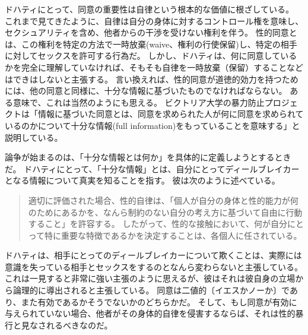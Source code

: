 \documentclass[paper=a4,book,openany]{jlreq}
\begin{document}
ドハティにとって、同意の重要性は自律という根本的な価値に根ざしている。
これまで見てきたように、自律は自分の身体に対するコントロール権を意味し、セクシュアリティを含め、他者からの干渉を受けない権利を伴う。
性的同意とは、この権利を特定の方法で一時放棄(waive、権利の行使保留)し、特定の相手に対してセックスを許可する行為だ。
しかし、ドハティは、何に同意しているかを完全に理解していなければ、そもそも自律を一時放棄（保留）することなどはできはしないと主張する。
言い換えれば、性的同意が道徳的効力を持つためには、他の同意と同様に、十分な情報に基づいたものでなければならない。
ある意味で、これは当然のようにも思える。
ビクトリア大学の暴力防止プロジェクトは「情報に基づいた同意とは、同意を求められた人が何に同意を求められているのかについて十分な情報(full information)をもっていることを意味する」と説明している\citep{project25:_consen}。

論争が始まるのは、「十分な情報とは何か」を具体的に定義しようとするときだ。
ドハティにとって、「十分な情報」とは、自分にとってディールブレイカーとなる情報について真実を知ることを指す。
彼は次のように述べている。

\begin{quote}
適切に評価された場合、性的自律は、「個人が自分の身体と性的能力が何のためにあるかを、なんら制約のない自分の考え方に基づいて自由に行動すること」\citep[p.70]{schulhofer92:_takin_sexual_auton_serious}を許容する。
したがって、性的な接触において、何が自分にとって特に重要な特徴であるかを決定することは、各個人に任されている。
\citep[p.730]{dougherty13:_sex_lies_consen}

\end{quote}

ドハティは、相手にとってのディールブレイカーについて欺くことは、実際には意識を失っている相手とセックスをするのとなんら変わらないと主張している。
これは一見すると非常に強い主張のように思えるが、彼はそれは彼自身の立場から論理的に導出されると主張している。
同意は二値的〔イエスかノーか〕であり、また有効であるかそうでないかのどちらかだ。
そして、もし同意が有効に与えられていない場合、他者がその身体的自律を侵害するならば、それは性的暴行と見なされるべきなのだ。
\end{document}
